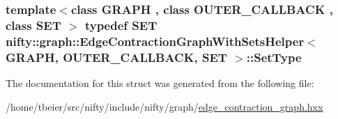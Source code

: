 \subsubsection[{Set\+Type}]{\setlength{\rightskip}{0pt plus 5cm}template$<$class G\+R\+A\+P\+H , class O\+U\+T\+E\+R\+\_\+\+C\+A\+L\+L\+B\+A\+C\+K , class S\+E\+T $>$ typedef S\+E\+T {\bf nifty\+::graph\+::\+Edge\+Contraction\+Graph\+With\+Sets\+Helper}$<$ G\+R\+A\+P\+H, O\+U\+T\+E\+R\+\_\+\+C\+A\+L\+L\+B\+A\+C\+K, S\+E\+T $>$\+::{\bf Set\+Type}}\label{structnifty_1_1graph_1_1EdgeContractionGraphWithSetsHelper_acc1b924a2b02648491b614c8d69ca9fb}


The documentation for this struct was generated from the following file\+:\begin{DoxyCompactItemize}
\item 
/home/tbeier/src/nifty/include/nifty/graph/\hyperlink{graph_2edge__contraction__graph_8hxx}{edge\+\_\+contraction\+\_\+graph.\+hxx}\end{DoxyCompactItemize}
